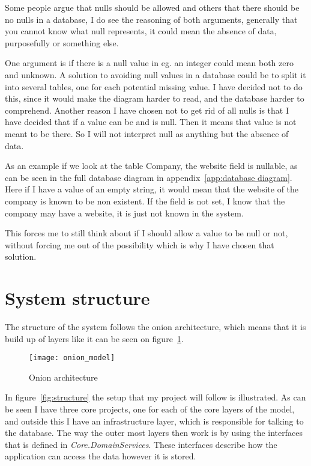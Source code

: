 Some people argue that nulls should be allowed and others that there should be
no nulls in a database\cite{stackexchange:db:nullfields}, I do see the reasoning
of both arguments, generally that you cannot know what null represents, it could
mean the absence of data, purposefully or something else. 

One argument is if there is a null value in eg. an integer could mean both zero
and unknown. A solution to avoiding null values in a database could be to split
it into several tables, one for each potential missing value. I have decided not
to do this, since it would make the diagram harder to read, and the database
harder to comprehend. Another reason I have chosen not to get rid of all nulls
is that I have decided that if a value can be and is null. Then it means that
value is not meant to be there. So I will not interpret null as anything but the
absence of data.

As an example if we look at the table Company, the website field is nullable, as
can be seen in the full database diagram in appendix~\ref{app:database diagram}.
Here if I have a value of an empty string, it would mean that the website of
the company is known to be non existent. If the field is not set, I know that
the company may have a website, it is just not known in the system.

This forces me to still think about if I should allow a value to be null or not,
without forcing me out of the possibility which is why I have chosen that
solution. 

\section{System structure}
\label{sec:System structure}
The structure of the system follows the onion
architecture\cite{onion_architecture}, which means that it is build up of layers
like it can be seen on figure~\ref{fig:Onion architecture}. 

\begin{figure}[h]
  \centering
  \texttt{[image: onion\_model]}
  \caption[Onion architecture]{Onion architecture\protect\footnotemark}
  \label{fig:Onion architecture}
\end{figure}

In figure~\ref{fig:structure} the setup that my project will follow is
illustrated. As can be seen I have three core projects, one for each of the core
layers of the model, and outside this I have an infrastructure layer, which is
responsible for talking to the database. The way the outer most layers then work
is by using the interfaces that is defined in \textit{Core.DomainServices}.
These interfaces describe how the application can access the data however it is
stored. 

